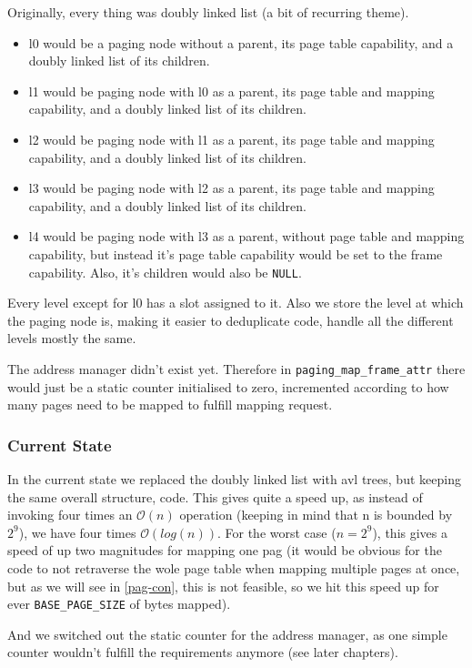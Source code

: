 Originally, every thing was doubly linked list (a bit of recurring theme). 
\begin{itemize}
	\item l0 would be a paging node without a parent, its page table capability,
				and a doubly linked list of its children.
	\item l1 would be paging node with l0 as a parent, its page table and mapping
				capability, and a doubly linked list of its children.
	\item l2 would be paging node with l1 as a parent, its page table and mapping
				capability, and a doubly linked list of its children.
	\item l3 would be paging node with l2 as a parent, its page table and mapping
				capability, and a doubly linked list of its children.
	\item l4 would be paging node with l3 as a parent, without page table and mapping
				capability, but instead it's page table capability would be set to the
				frame capability. Also, it's children would also be \verb|NULL|.
\end{itemize}

Every level except for l0 has a slot assigned to it. Also we store the level at
which the paging node is, making it easier to deduplicate code, handle all the
different levels mostly the same.

The address manager didn't exist yet. Therefore in \verb|paging_map_frame_attr|
there would just be a static counter initialised to zero, incremented according
to how many pages need to be mapped to fulfill mapping request.

\subsubsection{Current State}

In the current state we replaced the doubly linked list with avl trees, but
keeping the same overall structure, code.
This gives quite a speed up, as instead of invoking four times an $\mathcal{O}(n)$
operation (keeping in mind that n is bounded by $2^9$), we have four times
$\mathcal{O}(log(n))$. For the worst case ($n=2^9$), this gives a speed of up
two magnitudes for mapping one pag (it would be obvious for the code to not
retraverse the wole page table when mapping multiple pages at once, but as we
will see in \ref{pag-con}, this is not feasible, so we hit this speed up for
ever \verb|BASE_PAGE_SIZE| of bytes mapped).

And we switched out the static counter for the address manager, as one simple
counter wouldn't fulfill the requirements anymore (see later chapters).

